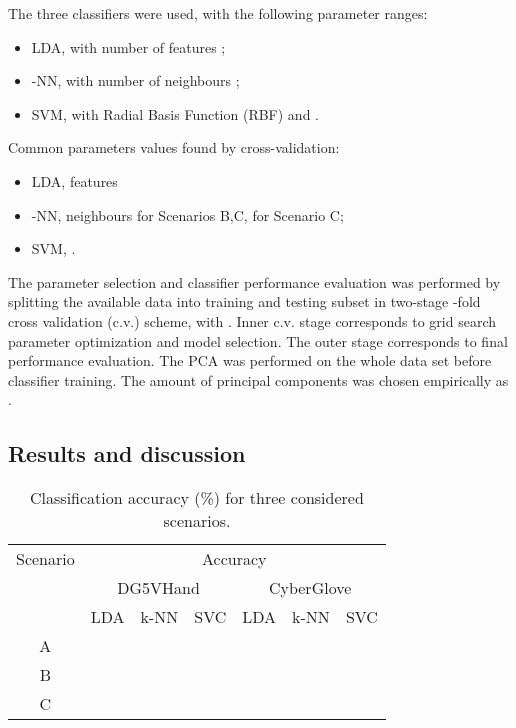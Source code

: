 \documentclass[]{article}
\begin{document}
The three classifiers were used, with the following parameter ranges:
\begin{itemize}
\item LDA, with number of features ;
\item -NN, with number of neighbours ;
\item SVM, with Radial Basis Function (RBF) and 
.
\end{itemize} 

Common parameters values found by cross-validation: 
\begin{itemize}
\item LDA,  features
\item -NN,  neighbours for Scenarios B,C,  for Scenario C;
\item SVM, 
 .
\end{itemize} 

The parameter selection and classifier performance evaluation was performed by
splitting the available data into training and testing subset in two-stage
-fold cross validation (c.v.) scheme, with . Inner c.v. stage
corresponds to grid search parameter optimization and model selection. The outer
stage corresponds to final performance evaluation. The PCA was performed on the
whole data set before classifier training. The amount of principal components
was chosen empirically as .

\subsection{Results and discussion}

\begin{table}[h]
\centering
\begin{tabular}{ccccccc}
\toprule
Scenario&\multicolumn{6}{c}{Accuracy}\\ 
\cmidrule(r){2-7}
&\multicolumn{3}{c}{DG5VHand}&\multicolumn{3}{c}{CyberGlove}\\ 
\cmidrule(r){2-4}\cmidrule(r){5-7}
&LDA&k-NN&SVC&LDA&k-NN&SVC\\
\midrule
A&&&&&&\\
B&&&&&&\\
C&&&&&&\\
\bottomrule
\end{tabular} 
\caption{Classification accuracy (\%) for three considered scenarios.}
\label{id:table:mean_accuracy}
\end{table}
\end{document}
